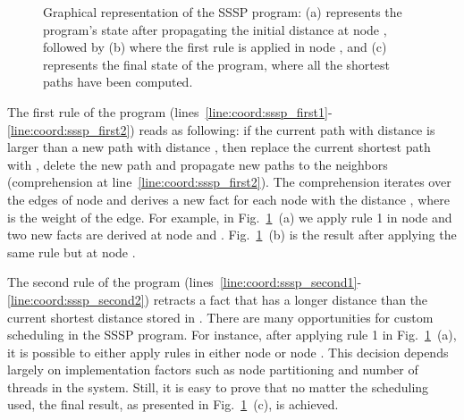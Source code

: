 \begin{figure}
\begin{center}
\begin{subfigure}[b]{0.49\textwidth}
      \caption{}
   \end{subfigure}
\end{center}

\caption{Graphical representation of the SSSP program: (a) represents the
   program's state after propagating the initial distance at node , followed by (b)
   where the first rule is applied in node , and (c) represents the
   final state of the program, where all the shortest paths have been computed.}

\label{fig:shortest_path_program}
\end{figure}

The first rule of the program
(lines~\ref{line:coord:sssp_first1}-\ref{line:coord:sssp_first2}) reads as
following: if the current  path  with distance 
is larger than a new path  with distance , then replace the
current shortest path with , delete the new  path and
propagate new paths to the neighbors (comprehension at
line~\ref{line:coord:sssp_first2}). The comprehension iterates over the edges of
node  and derives a new  fact for each node  with
the distance , where  is the weight of the edge. For
example, in Fig.~\ref{fig:shortest_path_program}~(a) we apply rule 1 in node
 and two new  facts are derived at node  and
.  Fig.~\ref{fig:shortest_path_program}~(b) is the result after
applying the same rule but at node .

The second rule of the program
(lines~\ref{line:coord:sssp_second1}-\ref{line:coord:sssp_second2}) retracts a
 fact that has a longer distance than the current shortest distance
stored in . There are many opportunities for custom scheduling
in the SSSP program. For instance, after applying rule 1 in
Fig.~\ref{fig:shortest_path_program}~(a), it is possible to either apply rules
in either node  or node .  This decision depends largely on
implementation factors such as node partitioning and number of threads in the
system. Still, it is easy to prove that no matter the scheduling used, the final
result, as presented in Fig.~\ref{fig:shortest_path_program}~(c), is achieved.

